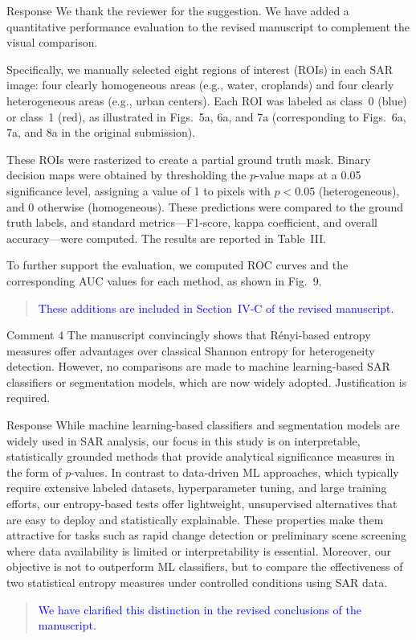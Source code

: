 \documentclass[11pt]{report}
\begin{document}
\begin{responsebox}{Response}
We thank the reviewer for the suggestion. We have added a quantitative performance evaluation to the revised manuscript to complement the visual comparison.

Specifically, we manually selected eight regions of interest (ROIs) in each SAR image: four clearly homogeneous areas (e.g., water, croplands) and four clearly heterogeneous areas (e.g., urban centers). Each ROI was labeled as class 0 (blue) or class 1 (red), as illustrated in Figs.~5a, 6a, and 7a (corresponding to Figs.~6a, 7a, and 8a in the original submission).

These ROIs were rasterized to create a partial ground truth mask. Binary decision maps were obtained by thresholding the $p$-value maps at a 0.05 significance level, assigning a value of 1 to pixels with $p < 0.05$ (heterogeneous), and 0 otherwise (homogeneous). These predictions were compared to the ground truth labels, and standard metrics—F1-score, kappa coefficient, and overall accuracy—were computed. The results are reported in Table~III.

To further support the evaluation, we computed ROC curves and the corresponding AUC values for each method, as shown in Fig.~9.

\begin{quote}
\textcolor{blue}{These additions are included in Section~IV-C of the revised manuscript.}
\end{quote}
\end{responsebox}




\begin{reviewbox}{Comment 4}
The manuscript convincingly shows that Rényi-based entropy measures offer advantages over classical Shannon entropy for heterogeneity detection. However, no comparisons are made to machine learning-based SAR classifiers or segmentation models, which are now widely adopted. Justification is required.
\end{reviewbox}
\begin{responsebox}{Response}
While machine learning-based classifiers and segmentation models are widely used in SAR analysis, our focus in this study is on interpretable, statistically grounded methods that provide analytical significance measures in the form of $p$-values. 
 In contrast to data-driven ML approaches, which typically require extensive labeled datasets, hyperparameter tuning, and large training efforts, our entropy-based tests offer lightweight, unsupervised alternatives that are easy to deploy and statistically explainable. These properties make them attractive for tasks such as rapid change detection or preliminary scene screening where data availability is limited or interpretability is essential. Moreover, our objective is not to outperform ML classifiers, but to compare the effectiveness of two statistical entropy measures under controlled conditions using SAR data.
\begin{quote}
\textcolor{blue}{We have clarified this distinction in the revised conclusions of the manuscript.}
\end{quote}
\end{responsebox}
\end{document}
